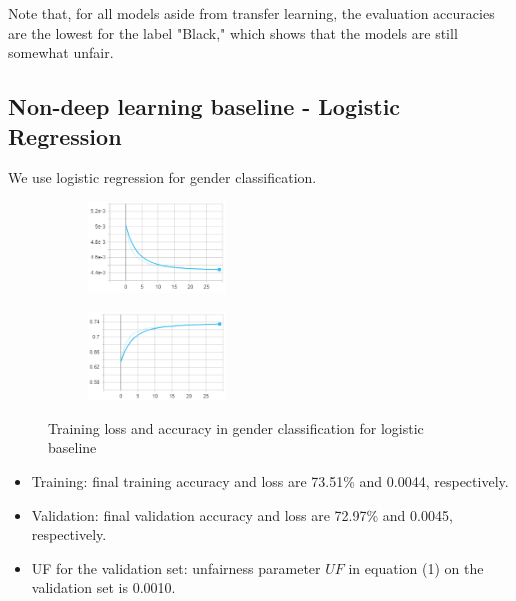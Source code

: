 Note that, for all models aside from transfer learning, the evaluation accuracies are the lowest for the label "Black," which shows that the models are still somewhat unfair.

\newpage
\subsection{Non-deep learning baseline - Logistic Regression}
We use logistic regression for gender classification.   

\begin{figure}[H]
	\centering
	\begin{subfigure}
		\centering
		\includegraphics[width=0.4\textwidth]{figure/logistic-loss.png}
	\end{subfigure}
	\quad
	\begin{subfigure}
		\centering
		\includegraphics[width=0.4\textwidth]{figure/logistic-acc.png}
	\end{subfigure}
	\caption{Training loss and accuracy in gender classification for logistic baseline}
	\label{fig: logistic}
\end{figure}

\begin{itemize}
\item Training: final training accuracy and loss are 73.51\% and 0.0044, respectively.  

\item Validation: final validation accuracy and loss are 72.97\% and 0.0045, respectively.

\item UF for the validation set: unfairness parameter $UF$ in equation (1) on the validation set is 0.0010.   
\end{itemize}

